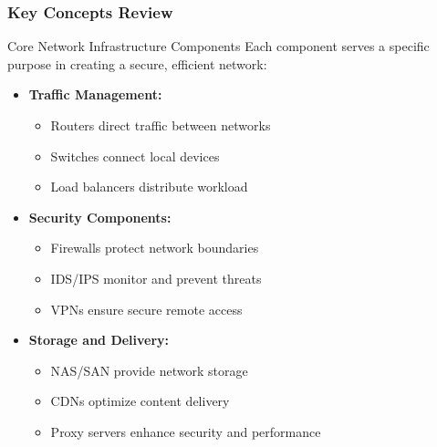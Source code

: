 \documentclass{beamer}
\begin{document}
\begin{frame}
    \frametitle{Key Concepts Review}
    
    \begin{block}{Core Network Infrastructure Components}
        Each component serves a specific purpose in creating a secure, efficient network:
    \end{block}
    
    \begin{itemize}
        \item \textbf{Traffic Management:}
        \begin{itemize}
            \item Routers direct traffic between networks
            \item Switches connect local devices
            \item Load balancers distribute workload
        \end{itemize}
        
        \item \textbf{Security Components:}
        \begin{itemize}
            \item Firewalls protect network boundaries
            \item IDS/IPS monitor and prevent threats
            \item VPNs ensure secure remote access
        \end{itemize}
        
        \item \textbf{Storage and Delivery:}
        \begin{itemize}
            \item NAS/SAN provide network storage
            \item CDNs optimize content delivery
            \item Proxy servers enhance security and performance
        \end{itemize}
    \end{itemize}
\end{frame}
\end{document}
